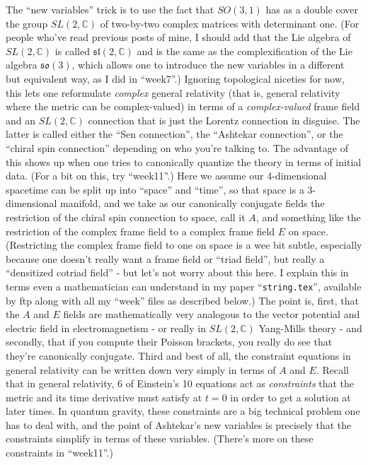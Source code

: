 \documentclass{article}
\begin{document}
The ``new variables'' trick is to use the fact that \(SO(3,1)\) has as a
double cover the group \(SL(2,\mathbb{C})\) of two-by-two complex
matrices with determinant one. (For people who've read previous posts of
mine, I should add that the Lie algebra of \(SL(2,\mathbb{C})\) is
called \(\mathfrak{sl}(2,\mathbb{C})\) and is the same as the
complexification of the Lie algebra \(\mathfrak{so}(3)\), which allows
one to introduce the new variables in a different but equivalent way, as
I did in ``week7''.) Ignoring topological niceties for now, this lets
one reformulate \emph{complex} general relativity (that is, general
relativity where the metric can be complex-valued) in terms of a
\emph{complex-valued} frame field and an \(SL(2,\mathbb{C})\) connection
that is just the Lorentz connection in disguise. The latter is called
either the ``Sen connection'', the ``Ashtekar connection'', or the
``chiral spin connection'' depending on who you're talking to. The
advantage of this shows up when one tries to canonically quantize the
theory in terms of initial data. (For a bit on this, try ``week11''.)
Here we assume our 4-dimensional spacetime can be split up into
``space'' and ``time'', so that space is a 3-dimensional manifold, and
we take as our canonically conjugate fields the restriction of the
chiral spin connection to space, call it \(A\), and something like the
restriction of the complex frame field to a complex frame field \(E\) on
space. (Restricting the complex frame field to one on space is a wee bit
subtle, especially because one doesn't really want a frame field or
``triad field'', but really a ``densitized cotriad field'' - but let's
not worry about this here. I explain this in terms even a mathematician
can understand in my paper ``\texttt{string.tex}'', available by ftp
along with all my ``week'' files as described below.) The point is,
first, that the \(A\) and \(E\) fields are mathematically very analogous
to the vector potential and electric field in electromagnetism - or
really in \(SL(2,\mathbb{C})\) Yang-Mills theory - and secondly, that if
you compute their Poisson brackets, you really do see that they're
canonically conjugate. Third and best of all, the constraint equations
in general relativity can be written down very simply in terms of \(A\)
and \(E\). Recall that in general relativity, 6 of Einstein's 10
equations act as \emph{constraints} that the metric and its time
derivative must satisfy at \(t = 0\) in order to get a solution at later
times. In quantum gravity, these constraints are a big technical problem
one has to deal with, and the point of Ashtekar's new variables is
precisely that the constraints simplify in terms of these variables.
(There's more on these constraints in ``week11''.)
\end{document}
